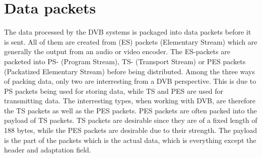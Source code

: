 


\section{Data packets}\label{sec:Data}
The data processed by the DVB systems is packaged into data packets 
before it is sent. All of them are created from (ES) packets 
(Elementary Stream) which are generally the output from an audio or 
video encoder. The ES-packets are packeted into PS- (Program Stream), 
TS- (Transport Stream) or PES packets (Packatized Elementary Stream) 
before being distributed. Among the three ways of packing data, only 
two are interresting from a DVB perspective. This is due to PS packets 
being used for storing data, while TS and PES are used for 
transmitting data. The interresting types, when working with DVB, are 
therefore the TS packets as well as the PES packets. PES packets are 
often packed into the payload of TS packets. TS packets are desirable 
since they are of a fixed length of 188 bytes, while the PES packets 
are desirable due to their strength. The payload is the part of the 
packets which is the actual data, which is everything except the 
header and adaptation field.

